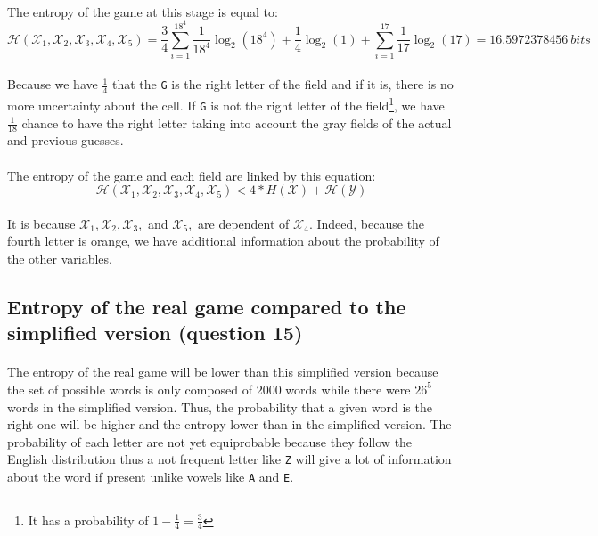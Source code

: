 \documentclass[a4paper, 11pt, oneside]{article}
\begin{document}
\paragraph{}The entropy of the game at this stage is equal to:
$$\mathcal{H}(\mathcal{X}_1, \mathcal{X}_2, \mathcal{X}_3, \mathcal{X}_4,\mathcal{X}_5) = \frac{3}{4} \sum_{i=1}^{18^4} \frac{1}{18^4} \log_2{(18^4)} + \frac{1}{4} \log_2{(1)} + \sum_{i=1}^{17} \frac{1}{17} \log_2{(17)} = 16.5972378456 \ bits$$
\paragraph{}Because we have $\frac{1}{4}$ that the \texttt{G} is the right letter of the field and if it is, there is no more uncertainty about the cell. If \texttt{G} is not the right letter of the field\footnote{It has a probability of $1 - \frac{1}{4} = \frac{3}{4}$}, we have $\frac{1}{18}$ chance to have the right letter taking into account the gray fields of the actual and previous guesses.

\paragraph{}The entropy of the game and each field are linked by this equation:
$$\mathcal{H}(\mathcal{X}_1, \mathcal{X}_2, \mathcal{X}_3, \mathcal{X}_4,\mathcal{X}_5) < 4 * {H}(\mathcal{X}) + \mathcal{H}(\mathcal{Y}) $$
\paragraph{}It is because $\mathcal{X}_1, \mathcal{X}_2, \mathcal{X}_3,$ and $\mathcal{X}_5,$ are dependent of $\mathcal{X}_4$. Indeed, because the fourth letter is orange, we have additional information about the probability of the other variables.

\subsection{Entropy of the real game compared to the simplified version (question 15)}

\paragraph{}The entropy of the real game will be lower than this simplified version because the set of possible words is only composed of 2000 words while there were $26^5$ words in the simplified version. Thus, the probability that a given word is the right one will be higher and the entropy lower than in the simplified version. 
The probability of each letter are not yet equiprobable because they follow the English distribution thus a not frequent letter like \texttt{Z} will give a lot of information about the word if present unlike vowels like \texttt{A} and \texttt{E}.
\end{document}
